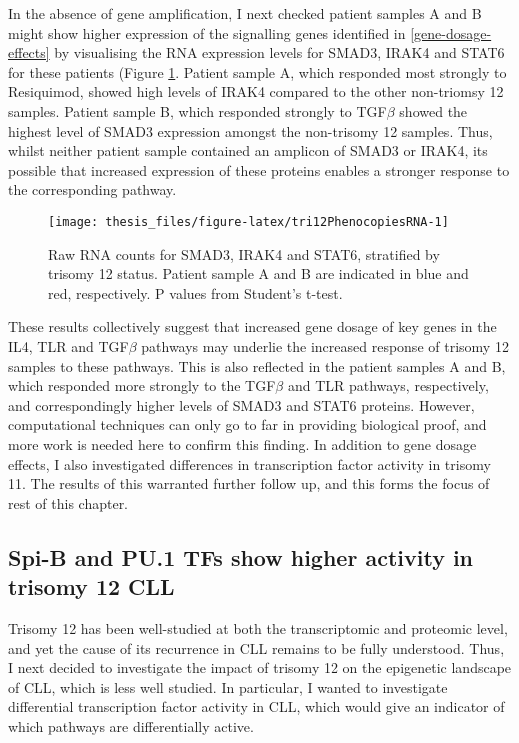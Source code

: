 \documentclass[11pt, a4paper, twosided]{book}
\begin{document}
In the absence of gene amplification, I next checked patient samples A and B might show higher expression of the signalling genes identified in \ref{gene-dosage-effects} by visualising the RNA expression levels for SMAD3, IRAK4 and STAT6 for these patients (Figure \ref{fig:tri12PhenocopiesRNA}. Patient sample A, which responded most strongly to Resiquimod, showed high levels of IRAK4 compared to the other non-triomsy 12 samples. Patient sample B, which responded strongly to TGF\(\beta\) showed the highest level of SMAD3 expression amongst the non-trisomy 12 samples. Thus, whilst neither patient sample contained an amplicon of SMAD3 or IRAK4, its possible that increased expression of these proteins enables a stronger response to the corresponding pathway.


\begin{figure}

{\centering \texttt{[image: thesis\_files/figure-latex/tri12PhenocopiesRNA-1]} 

}

\caption{Raw RNA counts for SMAD3, IRAK4 and STAT6, stratified by trisomy 12 status. Patient sample A and B are indicated in blue and red, respectively. P values from Student's t-test.}\label{fig:tri12PhenocopiesRNA}
\end{figure}
These results collectively suggest that increased gene dosage of key genes in the IL4, TLR and TGF\(\beta\) pathways may underlie the increased response of trisomy 12 samples to these pathways. This is also reflected in the patient samples A and B, which responded more strongly to the TGF\(\beta\) and TLR pathways, respectively, and correspondingly higher levels of SMAD3 and STAT6 proteins. However, computational techniques can only go to far in providing biological proof, and more work is needed here to confirm this finding. In addition to gene dosage effects, I also investigated differences in transcription factor activity in trisomy 11. The results of this warranted further follow up, and this forms the focus of rest of this chapter.

\hypertarget{spi-b-and-pu.1-tfs-show-higher-activity-in-trisomy-12-cll}{%
\subsection{Spi-B and PU.1 TFs show higher activity in trisomy 12 CLL}\label{spi-b-and-pu.1-tfs-show-higher-activity-in-trisomy-12-cll}}

Trisomy 12 has been well-studied at both the transcriptomic and proteomic level, and yet the cause of its recurrence in CLL remains to be fully understood. Thus, I next decided to investigate the impact of trisomy 12 on the epigenetic landscape of CLL, which is less well studied. In particular, I wanted to investigate differential transcription factor activity in CLL, which would give an indicator of which pathways are differentially active.
\end{document}
